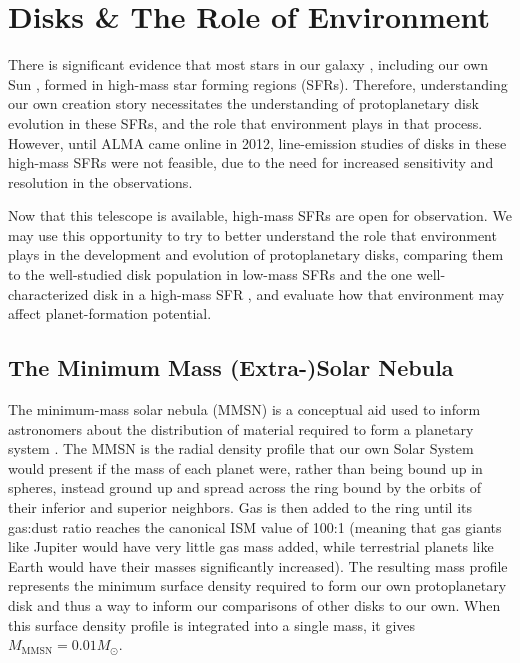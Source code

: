 \section{Disks \& The Role of Environment}


There is significant evidence that most stars in our galaxy \citep{LadaLada2003,Mann2015}, including our own Sun \citep{Gaidos2009,Tachibana2006}, formed in high-mass star forming regions (SFRs). Therefore, understanding our own creation story necessitates the understanding of protoplanetary disk evolution in these SFRs, and the role that environment plays in that process. However, until ALMA came online in 2012, line-emission studies of disks in these high-mass SFRs were not feasible, due to the need for increased sensitivity and resolution in the observations.

Now that this telescope is available, high-mass SFRs are open for observation. We may use this opportunity to try to better understand the role that environment plays in the development and evolution of protoplanetary disks, comparing them to the well-studied disk population in low-mass SFRs \citep[e.g.]{AndrewsWilliams2005,Mann2015} and the one well-characterized disk in a high-mass SFR \citep{Factor2017}, and evaluate how that environment may affect planet-formation potential.



\subsection{The Minimum Mass (Extra-)Solar Nebula}

The minimum-mass solar nebula (MMSN) is a conceptual aid used to inform astronomers about the distribution of material required to form a planetary system \citep{Weidenschilling1977}. The MMSN is the radial density profile that our own Solar System would present if the mass of each planet were, rather than being bound up in spheres, instead ground up and spread across the ring bound by the orbits of their inferior and superior neighbors. Gas is then added to the ring until its gas:dust ratio reaches the canonical ISM value of 100:1 (meaning that gas giants like Jupiter would have very little gas mass added, while terrestrial planets like Earth would have their masses significantly increased). The resulting mass profile represents the minimum surface density required to form our own protoplanetary disk and thus a way to inform our comparisons of other disks to our own. When this surface density profile is integrated into a single mass, it gives $M_\text{MMSN} = 0.01 M_{\odot}$.

